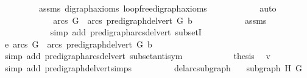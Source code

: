 \begin{isabellebody}
\ \ \ \ \ \ \ \ \ assms\ digraph{\isachardot}{\kern0pt}axioms{\isacharparenleft}{\kern0pt}{}{\isacharparenright}{\kern0pt}\ loopfree{\isacharunderscore}{\kern0pt}digraph{\isachardot}{\kern0pt}axioms{\isacharparenleft}{\kern0pt}{}{\isacharparenright}{\kern0pt}\isanewline
\ \ \ \ \ \ \ \ \ \ \isamarkupfalse%
\ auto\ \isanewline
\ \ \ \ \ \ \ \ \isamarkupfalse%
\ \isamarkupfalse%
\ {\isachardoublequoteopen}\ arcs\ G\ {\isasymsubseteq}\ arcs\ {\isacharparenleft}{\kern0pt}pre{\isacharunderscore}{\kern0pt}digraph{\isachardot}{\kern0pt}del{\isacharunderscore}{\kern0pt}vert\ G\ b{\isacharparenright}{\kern0pt}{\isachardoublequoteclose}\isanewline
\ \ \ \ \ \ \ \ \ \ \isamarkupfalse%
\ assms\isanewline
\ \ \ \ \ \ \ \ \ \ \isamarkupfalse%
\ {\isacharparenleft}{\kern0pt}simp\ add{\isacharcolon}{\kern0pt}\ pre{\isacharunderscore}{\kern0pt}digraph{\isachardot}{\kern0pt}arcs{\isacharunderscore}{\kern0pt}del{\isacharunderscore}{\kern0pt}vert\ subsetI{\isacharparenright}{\kern0pt}\ \isanewline
\ \ \ \ \ \ \ \ \isamarkupfalse%
\ \isamarkupfalse%
\ e{\isacharcolon}{\kern0pt}\ {\isachardoublequoteopen}arcs\ G\ {\isacharequal}{\kern0pt}\ arcs\ {\isacharparenleft}{\kern0pt}pre{\isacharunderscore}{\kern0pt}digraph{\isachardot}{\kern0pt}del{\isacharunderscore}{\kern0pt}vert\ G\ b{\isacharparenright}{\kern0pt}{\isachardoublequoteclose}\isanewline
\ \ \ \ \ \ \ \ \isamarkupfalse%
\ {\isacharparenleft}{\kern0pt}simp\ add{\isacharcolon}{\kern0pt}\ pre{\isacharunderscore}{\kern0pt}digraph{\isachardot}{\kern0pt}arcs{\isacharunderscore}{\kern0pt}del{\isacharunderscore}{\kern0pt}vert\ subset{\isacharunderscore}{\kern0pt}antisym{\isacharparenright}{\kern0pt}\isanewline
\ \ \ \ \ \ \ \ \isamarkupfalse%
\ \isamarkupfalse%
\ {\isacharquery}{\kern0pt}thesis\ \isamarkupfalse%
\ v\ \isamarkupfalse%
\ {\isacharparenleft}{\kern0pt}simp\ add{\isacharcolon}{\kern0pt}\ pre{\isacharunderscore}{\kern0pt}digraph{\isachardot}{\kern0pt}del{\isacharunderscore}{\kern0pt}vert{\isacharunderscore}{\kern0pt}simps{\isacharparenright}{\kern0pt}\isanewline
\ \ \ \ \ \ \isamarkupfalse%
%
\endisatagproof
{\isafoldproof}%
%
\isadelimproof
\ \isanewline
%
\endisadelimproof
\isanewline
{}\isamarkupfalse%
\ del{\isacharunderscore}{\kern0pt}arc{\isacharunderscore}{\kern0pt}subgraph{\isacharcolon}{\kern0pt}\isanewline
\ \ \ {\isachardoublequoteopen}subgraph\ H\ G{\isachardoublequoteclose}\isanewline

\end{isabellebody}
